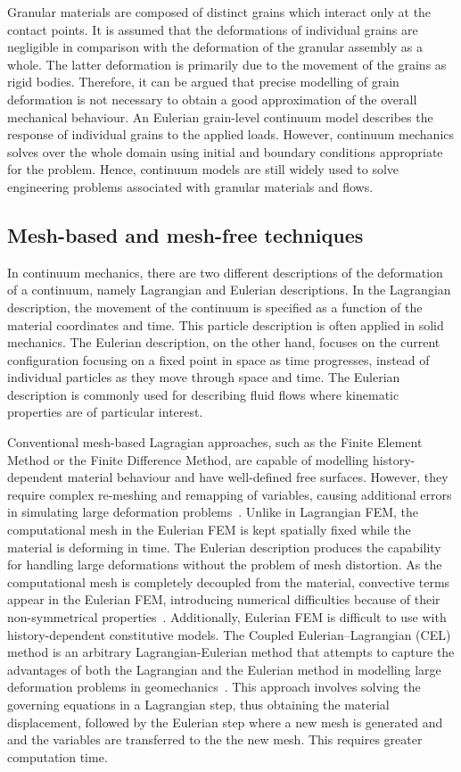 Granular materials are composed of distinct grains which interact only at 
the contact points. It is assumed that the deformations of individual grains 
are negligible in comparison with the deformation of the granular assembly as 
a whole. The latter deformation is primarily due to the movement of the grains 
as rigid bodies. Therefore, it can be argued that precise modelling of grain 
deformation is not necessary to obtain a good approximation of the overall 
mechanical behaviour. An Eulerian grain-level continuum model describes the 
response of individual grains to the applied loads. However, continuum 
mechanics solves over the whole domain using initial and boundary conditions 
appropriate for the problem. Hence, continuum models are still widely used to 
solve engineering problems associated with granular materials and flows.

\subsection{Mesh-based and mesh-free techniques}

In continuum mechanics, there are two different descriptions of the 
deformation of a continuum, namely Lagrangian and Eulerian 
descriptions. In the Lagrangian description, the movement of the continuum is 
specified as a function of the material coordinates and time. This particle 
description is often applied in solid mechanics. The Eulerian description, on 
the other hand, focuses on the current configuration focusing on a fixed point 
in space as time progresses, instead of individual particles as they move 
through space and time. The Eulerian description is commonly used for 
describing fluid flows where kinematic properties are of particular interest. 

Conventional mesh-based Lagragian approaches, such as the Finite Element Method 
or the Finite Difference Method, are capable of modelling history-dependent 
material behaviour and have well-defined free surfaces. However, they require 
complex re-meshing and remapping of variables, causing additional errors in 
simulating large deformation problems~\citep{Li2002}. Unlike in  Lagrangian 
FEM, the computational mesh in the Eulerian FEM is kept spatially fixed while 
the material is deforming in time. The Eulerian description produces the 
capability for handling large deformations without the problem of mesh 
distortion. As the computational mesh is completely decoupled from the 
material, convective terms appear in the Eulerian 
FEM, introducing numerical difficulties because of their non-symmetrical 
properties~\citep{Donea1982}. Additionally, Eulerian FEM is difficult to use
with history-dependent constitutive models. The Coupled Eulerian–Lagrangian 
(CEL) method is an arbitrary Lagrangian-Eulerian method that attempts to 
capture the advantages of both the Lagrangian and the Eulerian method in 
modelling large deformation problems in geomechanics~\citep{Qiu2011}. This 
approach involves solving the governing equations in a Lagrangian step, thus 
obtaining the material displacement, followed by the Eulerian step where a 
new mesh is generated and and the variables are transferred to the the new 
mesh. This requires greater computation time. 

